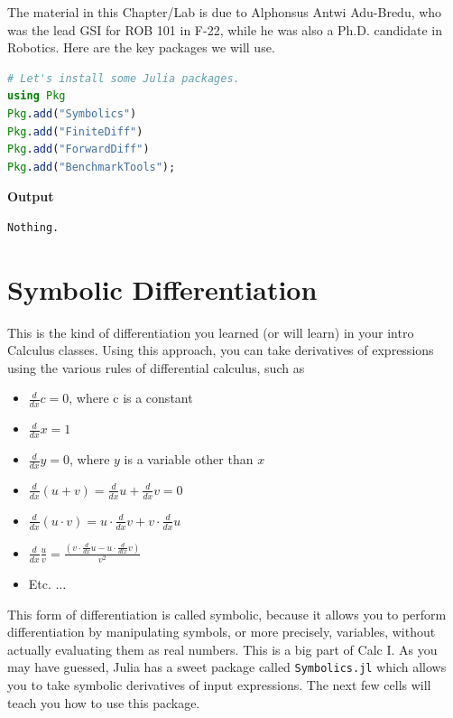 \newpage

The material in this Chapter/Lab is due to Alphonsus Antwi Adu-Bredu, who was the lead GSI for ROB 101 in F-22, while he was also a Ph.D. candidate in Robotics. Here are the key packages we will use. \\

\begin{lstlisting}[language=Julia,style=mystyle]
# Let's install some Julia packages. 
using Pkg
Pkg.add("Symbolics")
Pkg.add("FiniteDiff")
Pkg.add("ForwardDiff")
Pkg.add("BenchmarkTools");
\end{lstlisting}
\textbf{Output} 
\begin{verbatim}
Nothing.
\end{verbatim}

\section{Symbolic Differentiation}

This is the kind of differentiation you learned (or will learn) in your intro Calculus classes. Using this approach, you can take derivatives of expressions using the various rules of differential calculus, such as 
\begin{itemize}
    \item $\frac{d}{d x} c = 0 $, where c is a constant
\item $\frac{d}{d x} x = 1 $
\item $\frac{d}{d x} y = 0 $, where $y$ is a variable other than $x$
\item $\frac{d}{dx} (u + v) = \frac{d}{d x} u + \frac{d}{d x} v = 0 $
\item $\frac{d}{d x} (u \cdot v) = u \cdot \frac{d}{d x} v + v \cdot \frac{d}{d x} u $ 
\item $\frac{d}{d x} \frac{u}{v} = \frac{(v \cdot \frac{d}{d x}u -  u \cdot \frac{d}{dl x} v)}{v^2}$
\item Etc. $\dots$
\end{itemize}

This form of differentiation is called symbolic, because it allows you to perform differentiation by manipulating symbols, or more precisely, variables, without actually evaluating them as real numbers. This is a big part of Calc I. As you may have guessed, Julia has a sweet package called \texttt{Symbolics.jl} which allows you to take symbolic derivatives of input expressions. The next few cells will teach you how to use this package.\\

